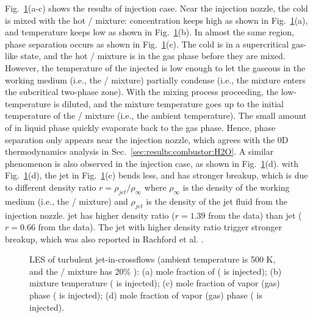 Fig.~\ref{JICFr}(a-c) shows the results of  injection case. Near the injection nozzle, the cold  is mixed with the hot / mixture:  concentration keeps high as shown in Fig.~\ref{JICFr}(a), and temperature keeps low as shown in Fig.~\ref{JICFr}(b). In almost the same region, phase separation occurs as shown in Fig.~\ref{JICFr}(c). The cold  is in a supercritical gas-like state, and the hot / mixture is in the gas phase before they are mixed. However, the temperature of the injected  is low enough to let the gaseous  in the working medium (i.e., the / mixture) partially condense (i.e., the mixture enters the subcritical two-phase zone). %
With the mixing process proceeding, the low-temperature  is diluted, and the mixture temperature goes up to the initial temperature of the / mixture (i.e., the ambient temperature). The small amount of  in liquid phase quickly evaporate back to the gas phase. Hence, phase separation only appears near the injection nozzle, which agrees with the 0D thermodynamics analysis in Sec.~\ref{sec:results:combustor:H2O}. A similar phenomenon is also observed in the  injection case, as shown in Fig.~\ref{JICFr}(d).  with Fig.~\ref{JICFr}(d), the jet in Fig.~\ref{JICFr}(c) bends less, and has stronger breakup, which is due to different density ratio $r=\rho_{jet}/\rho_{\infty}$ where $\rho_{\infty}$ is the density of the working medium (i.e., the / mixture) and $\rho_{jet}$ is the density of the jet fluid from the injection nozzle.  jet has higher density ratio ($r=1.39$ from the data) than  jet ($r=0.66$ from the data). The jet with higher density ratio trigger stronger breakup, which was also reported in Rachford et al. \cite{tretola2021effect}.

\begin{figure}[htb]
    \centering

    \caption{LES of turbulent jet-in-crossflows (ambient temperature is 500 K, and the / mixture has 20\% ): (a) mole fraction of  ( is injected); (b) mixture temperature ( is injected); (c) mole fraction of vapor (gas) phase ( is injected); (d) mole fraction of vapor (gas) phase ( is injected).}
    \label{JICFr}
\end{figure}

